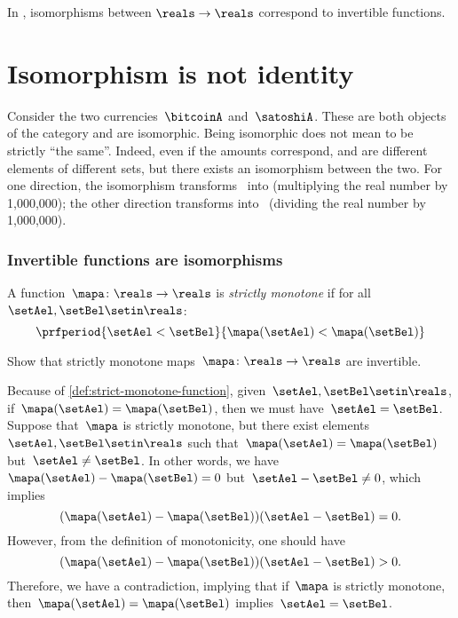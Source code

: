 \begin{example}
    In \Set, isomorphisms between $\reals\to \reals$ correspond to invertible functions.
\end{example}

\section{Isomorphism is not identity}
\begin{example}
    Consider the two currencies~$\bitcoinA$ and~$\satoshiA$.
    These are both objects of the category \Curr and are isomorphic.
    Being isomorphic does not mean to be strictly ``the same''.
    Indeed, even if the amounts correspond, \unit[1]{\bitcoinA} and \unit[1,000,000]{\satoshiA} are different elements of different sets, but there exists an isomorphism between the two.
    For one direction, the isomorphism transforms \bitcoinA \ into \satoshiA (multiplying the real number by 1,000,000);
    the other direction transforms \satoshiA into \bitcoinA \ (dividing the real number by 1,000,000).
\end{example}

\subsubsection{Invertible functions are isomorphisms}
\begin{definition}
    \label{def:strict-monotone-function}
    A function~$\mapa\colon \reals \to \reals$ is \emph{strictly monotone} if for all~$\setAel,\setBel\setin \reals$:
    \begin{equation}
        \prfperiod{\setAel < \setBel}{\mapa(\setAel)<\mapa(\setBel)}
    \end{equation}
\end{definition}
\begin{exercise}
    Show that strictly monotone maps~$\mapa\colon \reals \to \reals$ are invertible.
\end{exercise}
\begin{solution}
    Because of \cref{def:strict-monotone-function}, given~$\setAel,\setBel\setin \reals$, if~$\mapa(\setAel)=\mapa(\setBel)$, then we must have~$\setAel=\setBel$.
    Suppose that~$\mapa$ is strictly monotone, but there exist elements~$\setAel,\setBel\setin \reals$ such that~$\mapa(\setAel)=\mapa(\setBel)$ but~$\setAel\neq \setBel$.
    In other words, we have~$\mapa(\setAel)-\mapa(\setBel)=0$ but~$\setAel-\setBel\neq 0$, which implies
    \begin{equation}
        (\mapa(\setAel)-\mapa(\setBel))(\setAel-\setBel)=0.
    \end{equation}
    However, from the definition of monotonicity, one should have
    \begin{equation}
        (\mapa(\setAel)-\mapa(\setBel))(\setAel-\setBel)>0.
    \end{equation}
    Therefore, we have a contradiction, implying that if~$\mapa$ is strictly monotone, then~$\mapa(\setAel)=\mapa(\setBel)$ implies~$\setAel=\setBel$.
\end{solution}

